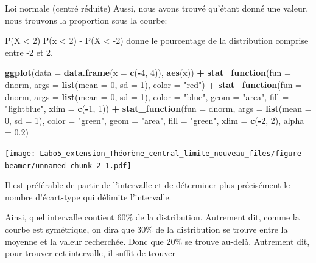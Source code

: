 \documentclass[ignorenonframetext,]{beamer}
\newenvironment{Shaded}{\begin{snugshade}}{\end{snugshade}}
\newcommand{\KeywordTok}[1]{\textcolor[rgb]{0.13,0.29,0.53}{\textbf{#1}}}
\newcommand{\DataTypeTok}[1]{\textcolor[rgb]{0.13,0.29,0.53}{#1}}
\newcommand{\DecValTok}[1]{\textcolor[rgb]{0.00,0.00,0.81}{#1}}
\newcommand{\FloatTok}[1]{\textcolor[rgb]{0.00,0.00,0.81}{#1}}
\newcommand{\StringTok}[1]{\textcolor[rgb]{0.31,0.60,0.02}{#1}}
\newcommand{\OperatorTok}[1]{\textcolor[rgb]{0.81,0.36,0.00}{\textbf{#1}}}
\newcommand{\NormalTok}[1]{#1}
\begin{document}
\begin{frame}[fragile]{Loi normale (centré réduite)}
Aussi, nous avons trouvé qu'étant donné une valeur, nous trouvons la
proportion sous la courbe:

P(X \textless{} 2) P(x \textless{} 2) - P(X \textless{} -2) donne le
pourcentage de la distribution comprise entre -2 et 2.

\begin{Shaded}
\begin{Highlighting}[]
\KeywordTok{ggplot}\NormalTok{(}\DataTypeTok{data =} \KeywordTok{data.frame}\NormalTok{(}\DataTypeTok{x =} \KeywordTok{c}\NormalTok{(}\OperatorTok{-}\DecValTok{4}\NormalTok{, }\DecValTok{4}\NormalTok{)), }\KeywordTok{aes}\NormalTok{(x)) }\OperatorTok{+}
\StringTok{  }\KeywordTok{stat_function}\NormalTok{(}\DataTypeTok{fun =}\NormalTok{ dnorm, }\DataTypeTok{args =} \KeywordTok{list}\NormalTok{(}\DataTypeTok{mean =} \DecValTok{0}\NormalTok{, }\DataTypeTok{sd =} \DecValTok{1}\NormalTok{), }\DataTypeTok{color =} \StringTok{"red"}\NormalTok{) }\OperatorTok{+}
\StringTok{  }\KeywordTok{stat_function}\NormalTok{(}\DataTypeTok{fun =}\NormalTok{ dnorm, }\DataTypeTok{args =} \KeywordTok{list}\NormalTok{(}\DataTypeTok{mean =} \DecValTok{0}\NormalTok{, }\DataTypeTok{sd =} \DecValTok{1}\NormalTok{), }\DataTypeTok{color =} \StringTok{"blue"}\NormalTok{,}
                \DataTypeTok{geom =} \StringTok{"area"}\NormalTok{, }\DataTypeTok{fill =} \StringTok{"lightblue"}\NormalTok{, }\DataTypeTok{xlim =} \KeywordTok{c}\NormalTok{(}\OperatorTok{-}\DecValTok{1}\NormalTok{, }\DecValTok{1}\NormalTok{)) }\OperatorTok{+}
\StringTok{    }\KeywordTok{stat_function}\NormalTok{(}\DataTypeTok{fun =}\NormalTok{ dnorm, }\DataTypeTok{args =} \KeywordTok{list}\NormalTok{(}\DataTypeTok{mean =} \DecValTok{0}\NormalTok{, }\DataTypeTok{sd =} \DecValTok{1}\NormalTok{), }\DataTypeTok{color =} \StringTok{"green"}\NormalTok{,}
                \DataTypeTok{geom =} \StringTok{"area"}\NormalTok{, }\DataTypeTok{fill =} \StringTok{"green"}\NormalTok{, }\DataTypeTok{xlim =} \KeywordTok{c}\NormalTok{(}\OperatorTok{-}\DecValTok{2}\NormalTok{, }\DecValTok{2}\NormalTok{), }\DataTypeTok{alpha =} \FloatTok{0.2}\NormalTok{)  }
\end{Highlighting}
\end{Shaded}

\texttt{[image: Labo5\_extension\_Théorème\_central\_limite\_nouveau\_files/figure-beamer/unnamed-chunk-2-1.pdf]}

Il est préférable de partir de l'intervalle et de déterminer plus
précisément le nombre d'écart-type qui délimite l'intervalle.

Ainsi, quel intervalle contient 60\% de la distribution. Autrement dit,
comme la courbe est symétrique, on dira que 30\% de la distribution se
trouve entre la moyenne et la valeur recherchée. Donc que 20\% se trouve
au-delà. Autrement dit, pour trouver cet intervalle, il suffit de
trouver


\end{frame}
\end{document}
